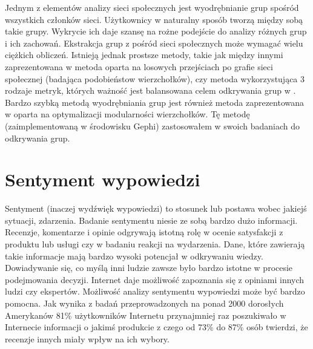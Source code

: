Jednym z elementów analizy sieci społecznych jest wyodrębnianie grup spośród
wszystkich członków sieci. Użytkownicy w naturalny sposób tworzą między sobą
takie grupy. Wykrycie ich daje szansę na rożne podejście do analizy różnych grup
i ich zachowań. Ekstrakcja grup z pośród sieci społecznych może wymagać wielu
ciężkich obliczeń. Istnieją jednak prostsze metody, takie jak między innymi
zaprezentowana w \cite{ComputingCommunitesInLargeNetworks} metoda oparta na
losowych przejściach po grafie sieci społecznej (badająca podobieństow
wierzchołków), czy metoda wykorzystująca 3 rodzaje metryk, których ważność jest
balansowana celem odkrywania grup w \cite{FindingCommunityStructure}.
Bardzo szybką metodą wyodrębniania grup jest również metoda zaprezentowana w
\cite{FastUnfoldingOfCommunites} oparta na optymalizacji modularności
wierzchołków. Tę metodę (zaimplementowaną w środowisku Gephi) zastosowałem w
swoich badaniach do odkrywania grup.












\section{Sentyment wypowiedzi}
Sentyment (inaczej wydźwięk wypowiedzi) to stosunek lub postawa wobec jakiejś
sytuacji, zdarzenia. Badanie sentymentu niesie ze sobą bardzo dużo informacji.
Recenzje, komentarze i opinie odgrywają istotną rolę w ocenie satysfakcji z
produktu lub usługi czy w badaniu reakcji na wydarzenia. Dane, które zawierają
takie informacje mają bardzo wysoki potencjał w odkrywaniu wiedzy.
Dowiadywanie się, co myślą inni ludzie zawsze było bardzo istotne w procesie
podejmowania decyzji. Internet daje możliwość zapoznania się z opiniami innych
ludzi czy ekspertów. Możliwość analizy sentymentu wypowiedzi może być bardzo
pomocna. Jak wynika z badań przeprowadzonych na ponad 2000 dorosłych Amerykanów
\cite{pangLee} 81\% użytkowników Internetu przynajmniej raz poszukiwało w
Internecie informacji o jakimś produkcie z czego od 73\% do 87\% osób twierdzi,
że recenzje innych miały wpływ na ich wybory.

